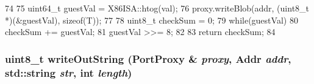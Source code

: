 \begin{DoxyCode}
74 {
75     uint64_t guestVal = X86ISA::htog(val);
76     proxy.writeBlob(addr, (uint8_t *)(&guestVal), sizeof(T));
77 
78     uint8_t checkSum = 0;
79     while(guestVal) {
80         checkSum += guestVal;
81         guestVal >>= 8;
82     }
83     return checkSum;
84 }
\end{DoxyCode}
\hypertarget{intelmp_8hh_a93b3fdf88faeff3328c156461d346a7a}{
\subsubsection[{writeOutString}]{\setlength{\rightskip}{0pt plus 5cm}uint8\_\-t writeOutString ({\bf PortProxy} \& {\em proxy}, \/  {\bf Addr} {\em addr}, \/  std::string {\em str}, \/  int {\em length})}}
\label{intelmp_8hh_a93b3fdf88faeff3328c156461d346a7a}
